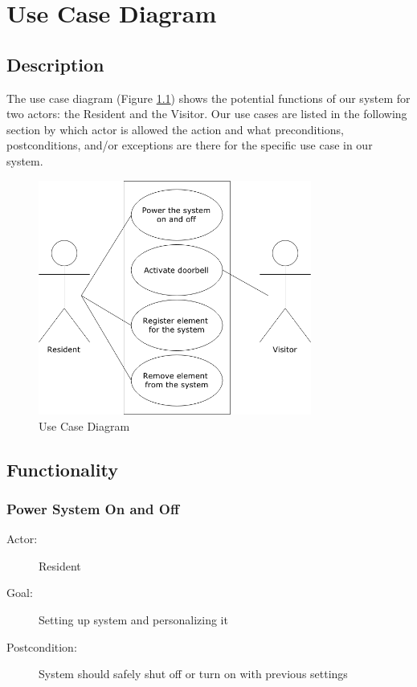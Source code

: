 \chapter{Use Case Diagram}

\section{Description}
The use case diagram (Figure \ref{fig:usecase}) shows the potential functions of our system for two actors: the Resident and the Visitor. Our use cases are listed in the following section by which actor is allowed the action and what preconditions, postconditions, and/or exceptions are there for the specific use case in our system.

\begin{figure}[h]
  \includegraphics[width=0.8\textwidth]{UseCase.png}
  \centering
  \caption{Use Case Diagram}
  \label{fig:usecase}
\end{figure}

\section{Functionality}

\subsection{Power System On and Off}
\begin{description}
\item [Actor:] Resident
\item [Goal:] Setting up system and personalizing it
\item [Postcondition:] System should safely shut off or turn on with previous settings
\end{description}
